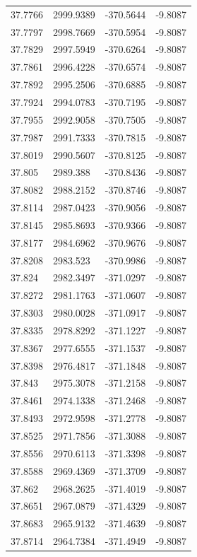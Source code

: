 \begin{table}[H]
\begin{tabular}{llll}
37.7766 & 2999.9389 & -370.5644 & -9.8087 \\
37.7797 & 2998.7669 & -370.5954 & -9.8087 \\
37.7829 & 2997.5949 & -370.6264 & -9.8087 \\
37.7861 & 2996.4228 & -370.6574 & -9.8087 \\
37.7892 & 2995.2506 & -370.6885 & -9.8087 \\
37.7924 & 2994.0783 & -370.7195 & -9.8087 \\
37.7955 & 2992.9058 & -370.7505 & -9.8087 \\
37.7987 & 2991.7333 & -370.7815 & -9.8087 \\
37.8019 & 2990.5607 & -370.8125 & -9.8087 \\
37.805 & 2989.388 & -370.8436 & -9.8087 \\
37.8082 & 2988.2152 & -370.8746 & -9.8087 \\
37.8114 & 2987.0423 & -370.9056 & -9.8087 \\
37.8145 & 2985.8693 & -370.9366 & -9.8087 \\
37.8177 & 2984.6962 & -370.9676 & -9.8087 \\
37.8208 & 2983.523 & -370.9986 & -9.8087 \\
37.824 & 2982.3497 & -371.0297 & -9.8087 \\
37.8272 & 2981.1763 & -371.0607 & -9.8087 \\
37.8303 & 2980.0028 & -371.0917 & -9.8087 \\
37.8335 & 2978.8292 & -371.1227 & -9.8087 \\
37.8367 & 2977.6555 & -371.1537 & -9.8087 \\
37.8398 & 2976.4817 & -371.1848 & -9.8087 \\
37.843 & 2975.3078 & -371.2158 & -9.8087 \\
37.8461 & 2974.1338 & -371.2468 & -9.8087 \\
37.8493 & 2972.9598 & -371.2778 & -9.8087 \\
37.8525 & 2971.7856 & -371.3088 & -9.8087 \\
37.8556 & 2970.6113 & -371.3398 & -9.8087 \\
37.8588 & 2969.4369 & -371.3709 & -9.8087 \\
37.862 & 2968.2625 & -371.4019 & -9.8087 \\
37.8651 & 2967.0879 & -371.4329 & -9.8087 \\
37.8683 & 2965.9132 & -371.4639 & -9.8087 \\
37.8714 & 2964.7384 & -371.4949 & -9.8087 \\

\end{tabular}
\end{table}

